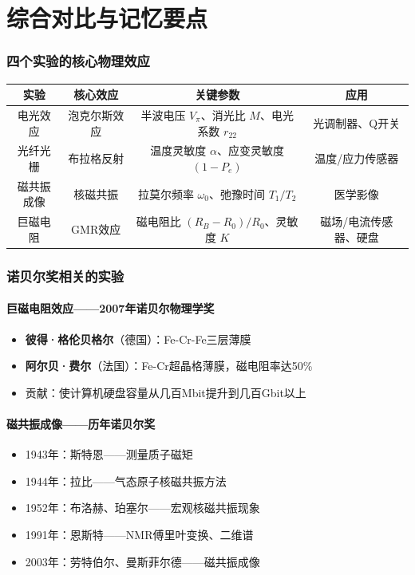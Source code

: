 \documentclass[12pt,a4paper]{article}
\begin{document}
\newpage

\part{综合对比与记忆要点}

\section{四个实验的核心物理效应}

\begin{tabular}{|c|c|c|c|}
    \hline
    \textbf{实验} & \textbf{核心效应} & \textbf{关键参数} & \textbf{应用} \\
    \hline
    电光效应 & 泡克尔斯效应 & 半波电压 \(V_\pi\)、消光比 \(M\)、电光系数 \(r_{22}\) & 光调制器、Q开关 \\
    \hline
    光纤光栅 & 布拉格反射 & 温度灵敏度 \(\alpha\)、应变灵敏度 \((1-P_e)\) & 温度/应力传感器 \\
    \hline
    磁共振成像 & 核磁共振 & 拉莫尔频率 \(\omega_0\)、弛豫时间 \(T_1/T_2\) & 医学影像 \\
    \hline
    巨磁电阻 & GMR效应 & 磁电阻比 \((R_B-R_0)/R_0\)、灵敏度 \(K\) & 磁场/电流传感器、硬盘 \\
    \hline
\end{tabular}

\section{诺贝尔奖相关的实验}

\subsection*{巨磁电阻效应——2007年诺贝尔物理学奖}
\begin{itemize}
    \item \textbf{彼得·格伦贝格尔}（德国）：Fe-Cr-Fe三层薄膜
    \item \textbf{阿尔贝·费尔}（法国）：Fe-Cr超晶格薄膜，磁电阻率达50\%
    \item 贡献：使计算机硬盘容量从几百Mbit提升到几百Gbit以上
\end{itemize}

\subsection*{磁共振成像——历年诺贝尔奖}
\begin{itemize}
    \item 1943年：斯特恩——测量质子磁矩
    \item 1944年：拉比——气态原子核磁共振方法
    \item 1952年：布洛赫、珀塞尔——宏观核磁共振现象
    \item 1991年：恩斯特——NMR傅里叶变换、二维谱
    \item 2003年：劳特伯尔、曼斯菲尔德——磁共振成像
\end{itemize}
\end{document}
